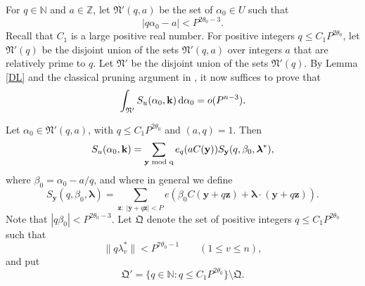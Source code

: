 \documentclass[12pt,reqno]{amsart}
\theoremstyle{definition}
\theoremstyle{remark}
\numberwithin{equation}{section}
\begin{document}
For $q \in {\mathbb N}$ and $a \in {\mathbb Z}$, let ${\mathfrak N}'(q,a)$ be the set of ${{\alpha}}_0 \in U$ such that
\[
|q {{\alpha}}_0 - a| < P^{2 {{\theta}}_0 - 3}.
\]
Recall that $C_1$ is a large positive real number. For positive integers $q {\leqslant} C_1P^{2{{\theta}}_0}$, let ${\mathfrak N}'(q)$ be the disjoint union of the sets ${\mathfrak N}'(q,a)$ over integers $a$ that are relatively prime to $q$. Let ${\mathfrak N}'$ be the disjoint union of the sets ${\mathfrak N}'(q)$. By Lemma \ref{DL} and the classical pruning argument in \cite[Lemma 15.1]{Dav2005}, it now suffices to prove that
\[
\int_{{\mathfrak N}'} S_u({{\alpha}}_0, {\mathbf k}) {{\,{\rm d}}} {{\alpha}}_0 = o(P^{n-3}).
\]

Let ${{\alpha}}_0 \in {\mathfrak N}'(q,a)$, with $q {\leqslant} C_1P^{2{{\theta}}_0}$ and $(a,q) = 1$. Then
\[
S_u({{\alpha}}_0,{\mathbf k}) = \sum_{{\mathbf y} {\,\,\rm{mod}\,\,q}} e_q(aC({\mathbf y}))  S_{\mathbf y}(q, {{\beta}}_0, {{\boldsymbol {{\lambda}}}}^*),
\]
where ${{\beta}}_0 = {{\alpha}}_0 - a/q$, and where in general we define
\[
S_{\mathbf y}(q, {{\beta}}_0, {{\boldsymbol {{\lambda}}}}) = \sum_{{\mathbf z}: \: |{\mathbf y}+q{\mathbf z}| < P} e({{\beta}}_0 C({\mathbf y} + q {\mathbf z}) + {{\boldsymbol {{\lambda}}}} \cdot ({\mathbf y} + q {\mathbf z})).
\]
Note that $|q {{\beta}}_0| < P^{2 {{\theta}}_0 - 3}$. Let ${\mathfrak Q}$ denote the set of positive integers $q {\leqslant} C_1P^{2{{\theta}}_0}$ such that 
\[
\| q {{\lambda}}^*_v \| < P^{7 {{\theta}}_0 - 1} \qquad (1 {\leqslant} v {\leqslant} n),
\]
and put
\[
{\mathfrak Q}' = \{ q \in {\mathbb N}: q {\leqslant} C_1P^{2{{\theta}}_0} \} \setminus {\mathfrak Q}.
\]
\end{document}
